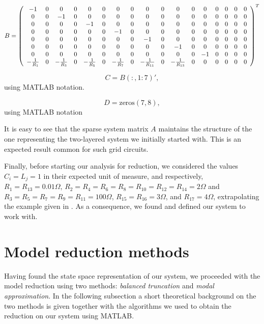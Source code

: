 \documentclass[10pt,a4paper]{article}
\begin{document}
\begin{landscape}
\begin{equation}\label{eq:B}
B = \left(\begin{array}{c c c c c c c c c c c c c c c c c}
-1 & 0& 0 & 0 & 0 & 0& 0& 0& 0& 0 & 0 & 0 & 0& 0& 0& 0& 0 \\
0 & 0& -1 & 0 & 0 & 0& 0& 0& 0& 0 & 0 & 0 & 0& 0& 0& 0& 0 \\
0 & 0& 0 & 0 & -1 & 0& 0& 0& 0& 0 & 0 & 0 & 0& 0& 0& 0& 0 \\
0 & 0& 0 & 0 & 0 & 0& -1& 0& 0& 0 & 0 & 0 & 0& 0& 0& 0& 0 \\
0 & 0& 0 & 0 & 0 & 0& 0& 0& -1& 0 & 0 & 0 & 0& 0& 0& 0& 0 \\
0 & 0& 0 & 0 & 0 & 0& 0& 0& 0& 0 & -1 & 0 & 0& 0& 0& 0& 0 \\
0 & 0& 0 & 0 & 0 & 0& 0& 0& 0& 0 & 0 & 0 & -1& 0& 0& 0& 0 \\
-\frac{1}{R_1} & 0& -\frac{1}{R_3} & 0 & -\frac{1}{R_5} & 0& -\frac{1}{R_7}& 0& -\frac{1}{R_{11}}& 0 & -\frac{1}{R_{13}} & 0 & 0& 0& 0& 0& 0 \\
\end{array}\right)^T
\end{equation}

\begin{equation}\label{eq:C}
C = B(:,1:7)',
\end{equation}
using MATLAB notation.

\begin{equation}\label{eq:D}
D = \text{zeros}(7,8),
\end{equation}
using MATLAB notation
\end{landscape}

It is easy to see that the sparse system matrix $A$ maintains the structure of the one representing the two-layered system we initially started with. This is an expected result common for such grid circuits.

Finally, before starting our analysis for reduction, we considered the values
$C_i = L_j = 1$ in their expected unit of measure, and respectively, $R_1 = R_{13} = 0.01 \Omega$, $R_2 =  R_4 = R_6 = R_8 = R_{10} = R_{12} = R_{14} = 2\Omega$ and $R_3  = R_5 = R_7 = R_9 = R_{11} = 100 \Omega$, $R_{15} = R_{16} = 3 \Omega$, and $R_{17} = 4 \Omega$, extrapolating the example given in \cite{task}. As a consequence, we found and defined our system to work with.

\section{Model reduction methods}
Having found the state space representation of our system, we proceeded with the model reduction using two methods: \textit{balanced truncation} and \textit{modal approximation}. In the following subsection a short theoretical background on the two methods is given together with the algorithms we used to obtain the reduction on our system using MATLAB.
\end{document}
